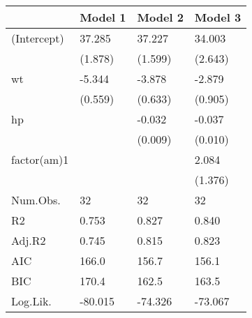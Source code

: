 
\begin{tabular}{llll}
\toprule
        & Model 1 & Model 2 & Model 3\\
\midrule
(Intercept) & 37.285 & 37.227 & 34.003\\
 & (1.878) & (1.599) & (2.643)\\
wt & -5.344 & -3.878 & -2.879\\
 & (0.559) & (0.633) & (0.905)\\
hp &  & -0.032 & -0.037\\
 &  & (0.009) & (0.010)\\
factor(am)1 &  &  & 2.084\\
 &  &  & (1.376)\\
\midrule
Num.Obs. & 32 & 32 & 32\\
R2 & 0.753 & 0.827 & 0.840\\
Adj.R2 & 0.745 & 0.815 & 0.823\\
AIC & 166.0 & 156.7 & 156.1\\
BIC & 170.4 & 162.5 & 163.5\\
Log.Lik. & -80.015 & -74.326 & -73.067\\
\bottomrule
\end{tabular}
